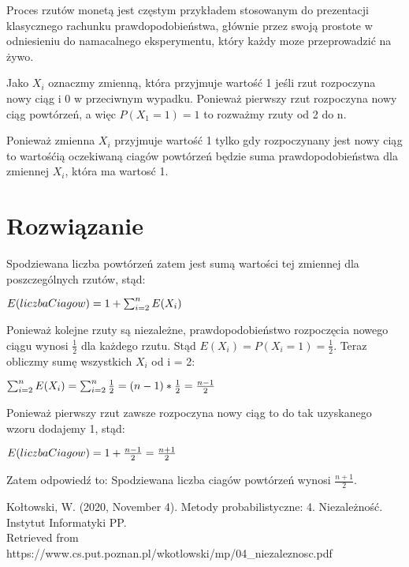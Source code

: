 \documentclass[12pt,oneside,a4paper]{book} %
\theoremstyle{break}
\begin{document}
Proces rzutów monetą jest częstym przykładem stosowanym do prezentacji klasycznego rachunku prawdopodobieństwa, głównie przez swoją prostote w odniesieniu do namacalnego eksperymentu, który każdy moze przeprowadzić na żywo.

Jako $X_i$ oznaczmy zmienną, która przyjmuje wartość 1 jeśli rzut rozpoczyna nowy ciąg i 0 w przeciwnym wypadku. Ponieważ pierwszy rzut rozpoczyna nowy ciąg powtórzeń, a więc $P(X_1=1)=1$ to rozważmy rzuty od 2 do n. 

Ponieważ zmienna $X_i$ przyjmuje wartość 1 tylko gdy rozpoczynany jest nowy ciąg to wartośćią oczekiwaną ciagów powtórzeń będzie suma prawdopodobieństwa dla zmiennej $X_i$, która ma wartosć 1.



\chapter*{Rozwiązanie}

Spodziewana liczba powtórzeń zatem jest sumą wartości tej zmiennej dla poszczególnych rzutów, stąd:

\begin{math}
  \centering
  E(liczbaCiagow) = 1 + \sum_{i=2}^{n}E(X_i)
\end{math}

Ponieważ kolejne rzuty są niezależne, prawdopodobieństwo rozpoczęcia nowego ciągu wynosi $\frac{1}{2}$ dla każdego rzutu. Stąd $E(X_i)=P(X_i=1)=\frac{1}{2}$. Teraz obliczmy sumę wszystkich $X_i$ od i = 2:

\begin{math}
  \centering
  \sum_{i=2}^{n}E(X_i) = \sum_{i=2}^{n}\frac{1}{2} = (n-1)*\frac{1}{2} = \frac{n-1}{2}
\end{math}

Ponieważ pierwszy rzut zawsze rozpoczyna nowy ciąg to do tak uzyskanego wzoru dodajemy 1, stąd:

\begin{math}
  \centering
  E(liczbaCiagow) = 1 + \frac{n-1}{2} = \frac{n+1}{2}
\end{math}

Zatem odpowiedź to: Spodziewana liczba ciagów powtórzeń wynosi $\frac{n+1}{2}$.

\begin{thebibliography}{00}
  Kołtowski, W. (2020, November 4). Metody probabilistyczne: 4. Niezależność. Instytut Informatyki PP.\\ Retrieved from https://www.cs.put.poznan.pl/wkotlowski/mp/04\_niezaleznosc.pdf
\end{thebibliography}
\end{document}
